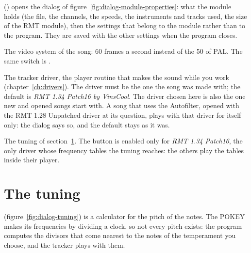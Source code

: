  () opens the dialog of figure~\ref{fig:dialog-module-properties}: what the
module holds (the file, the channels, the speeds, the instruments and tracks used, the size of the RMT module), then the settings that
belong to the module rather than to the program. They are saved with the other settings when the program closes.


\begin{description}[style=nextline,leftmargin=1.2cm]
  \item[NTSC system speed (60 Hz)] The video system of the song: 60 frames a second instead of the 50 of PAL. The same switch is
        .
  \item[RMT Driver Version] The tracker driver, the player routine that makes the sound while you work (chapter~\ref{ch:drivers}). The
        driver must be the one the song was made with; the default is \emph{RMT 1.34 Patch16 by VinsCool}. The driver chosen here is
        also the one new and opened songs start with. A song that uses the Autofilter, opened with the RMT 1.28 Unpatched driver at
        its question, plays with that driver for itself only: the dialog says so, and the default stays as it was.
  \item[Tuning\ldots] The tuning of section~\ref{sec:tuning}. The button is enabled only for \emph{RMT 1.34 Patch16}, the only
        driver whose frequency tables the tuning reaches: the others play the tables inside their player.
\end{description}

\section{The tuning}\label{sec:tuning}

 (figure~\ref{fig:dialog-tuning}) is a calculator for the pitch of the notes. The POKEY makes its
frequencies by dividing a clock, so not every pitch exists: the program computes the divisors that come nearest to the notes of
the temperament you choose, and the tracker plays with them.


